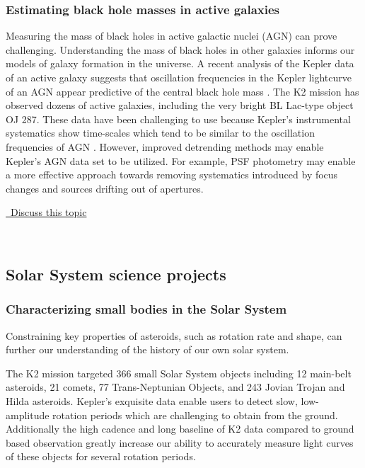 \documentclass[modern]{aastex62}
\newcommand{\commentlink}[1]{\href{https://github.com/KeplerGO/ScientificOpportunities/issues/#1}{\sc \faExternalLink\ Discuss this topic}\,\,}
\begin{document}
\subsubsection{Estimating black hole masses in active galaxies}
Measuring the mass of black holes in active galactic nuclei (AGN) can prove challenging. Understanding the mass of black holes in other galaxies informs our models of galaxy formation in the universe. A recent analysis of the Kepler data of an active galaxy suggests that oscillation frequencies in the Kepler lightcurve of an AGN appear predictive of the central black hole mass \citep{smith2018}. The K2 mission has observed dozens of active galaxies, including the very bright BL Lac-type object OJ 287.  These data have been challenging to use because Kepler's instrumental systematics show time-scales which tend to be similar to the oscillation frequencies of AGN \citep{obrien2018}. However, improved detrending methods may enable Kepler's AGN data set to be utilized. For example, PSF photometry may enable a more effective approach towards removing systematics introduced by focus changes and sources drifting out of apertures.
\\
\begin{center}
\commentlink{19}
\end{center}
\ \\

\subsection{Solar System science projects}

\subsubsection{Characterizing small bodies in the Solar System}
Constraining key properties of asteroids, such as rotation rate and shape, can further our understanding of the history of our own solar system.

The K2 mission targeted 366 small Solar System objects including  12 main-belt asteroids, 21 comets, 77 Trans-Neptunian Objects, and 243 Jovian Trojan and Hilda asteroids.
Kepler's exquisite data enable users to detect slow, low-amplitude rotation periods which are challenging to obtain from the ground. Additionally the high cadence and long baseline of K2 data compared to ground based observation greatly increase our ability to accurately measure light curves of these objects for several rotation periods.
\end{document}
